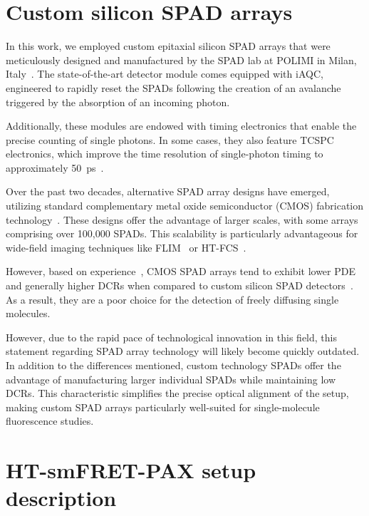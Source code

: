 \section{Custom silicon SPAD arrays}
\label{sec:SPAD_intro}

In this work, we employed custom epitaxial silicon \ac{SPAD} arrays that were meticulously designed and manufactured by the \ac{SPAD} lab at \ac{POLIMI} in Milan, Italy~\cite{ghioni_JSTQE_2007,gulinatti_JMO_2012,gulinatti_SPIE_2013}. 
The state-of-the-art detector module comes equipped with \ac{iAQC}, engineered to rapidly reset the \ac{SPAD}s following the creation of an avalanche triggered by the absorption of an incoming photon.

Additionally, these modules are endowed with timing electronics that enable the precise counting of single photons. 
In some cases, they also feature \ac{TCSPC} electronics, which improve the time resolution of single-photon timing to approximately 50~ps~\cite{ingargiola_SPIE_2017}.

Over the past two decades, alternative \ac{SPAD} array designs have emerged, utilizing standard complementary metal oxide semiconductor (\ac{CMOS}) fabrication technology~\cite{bruschini_SPIE_2017}. 
These designs offer the advantage of larger scales, with some arrays comprising over 100,000 \ac{SPAD}s. 
This scalability is particularly advantageous for wide-field imaging techniques like \ac{FLIM}~\cite{gyongy_IEEETED_2018, ulku_JSTQE_2019} or \ac{HT-FCS}~\cite{buchholz_BJ_2018}.

However, based on experience~\cite{ colyer_SPIE_2011}, \ac{CMOS} \ac{SPAD} arrays tend to exhibit lower \ac{PDE} and generally higher \ac{DCR}s when compared to custom silicon \ac{SPAD} detectors~\cite{ghioni_JSTQE_2007, michalet_JSTQE_2014}. 
As a result, they are a poor choice for the detection of freely diffusing single molecules.

However, due to the rapid pace of technological innovation in this field, this statement regarding \ac{SPAD} array technology will likely become quickly outdated. 
In addition to the differences mentioned, custom technology \ac{SPAD}s offer the advantage of manufacturing larger individual \ac{SPAD}s while maintaining low \ac{DCR}s. 
This characteristic simplifies the precise optical alignment of the setup, making custom \ac{SPAD} arrays particularly well-suited for single-molecule fluorescence studies.

\section{HT-smFRET-PAX setup description}
\label{sec:smFRET-PAX_setup}


